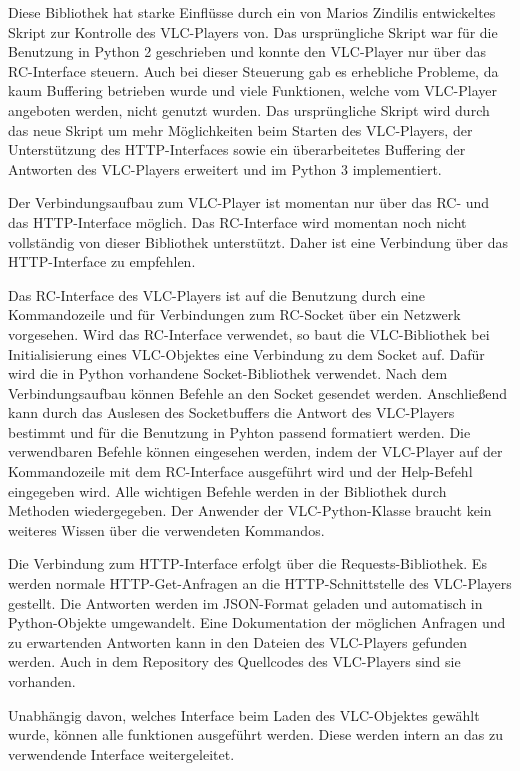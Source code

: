 \documentclass[12pt,a4paper,hidelinks]{scrreprt}
\begin{document}
	Diese Bibliothek hat starke Einflüsse durch ein von Marios Zindilis entwickeltes Skript zur Kontrolle des VLC-Players von. Das ursprüngliche Skript war für die Benutzung in Python 2 geschrieben und konnte den VLC-Player nur über das RC-Interface steuern. Auch bei dieser Steuerung gab es erhebliche Probleme, da kaum Buffering betrieben wurde und viele Funktionen, welche vom VLC-Player angeboten werden, nicht genutzt wurden. \cite{vlcpython}
	Das ursprüngliche Skript wird durch das neue Skript um mehr Möglichkeiten beim Starten des VLC-Players, der Unterstützung des HTTP-Interfaces sowie ein überarbeitetes Buffering der Antworten des VLC-Players erweitert und im Python 3 implementiert.
	
	Der Verbindungsaufbau zum VLC-Player ist momentan nur über das RC- und das HTTP-Interface möglich. Das RC-Interface wird momentan noch nicht vollständig von dieser Bibliothek unterstützt. Daher ist eine Verbindung über das HTTP-Interface zu empfehlen.
	
	Das RC-Interface des VLC-Players ist auf die Benutzung durch eine Kommandozeile und für Verbindungen zum RC-Socket über ein Netzwerk vorgesehen. Wird das RC-Interface verwendet, so baut die VLC-Bibliothek bei Initialisierung eines VLC-Objektes eine Verbindung zu dem Socket auf. Dafür wird die in Python vorhandene Socket-Bibliothek verwendet. 
	Nach dem Verbindungsaufbau können Befehle an den Socket gesendet werden. Anschließend kann durch das Auslesen des Socketbuffers die Antwort des VLC-Players bestimmt und für die Benutzung in Pyhton passend formatiert werden.
	Die verwendbaren Befehle können eingesehen werden, indem der VLC-Player auf der Kommandozeile mit dem RC-Interface ausgeführt wird und der Help-Befehl eingegeben wird. Alle wichtigen Befehle werden in der Bibliothek durch Methoden wiedergegeben. Der Anwender der VLC-Python-Klasse braucht kein weiteres Wissen über die verwendeten Kommandos.
	
	Die Verbindung zum HTTP-Interface erfolgt über die Requests-Bibliothek. Es werden normale HTTP-Get-Anfragen an die HTTP-Schnittstelle des VLC-Players gestellt. Die Antworten werden im JSON-Format geladen und automatisch in Python-Objekte umgewandelt. Eine Dokumentation der möglichen Anfragen und zu erwartenden Antworten kann in den Dateien des VLC-Players gefunden werden. Auch in dem Repository des Quellcodes des VLC-Players sind sie vorhanden. \cite{vlchttpdoc}
	
	Unabhängig davon, welches Interface beim Laden des VLC-Objektes gewählt wurde, können alle funktionen ausgeführt werden. Diese werden intern an das zu verwendende Interface weitergeleitet.
	
\end{document}
